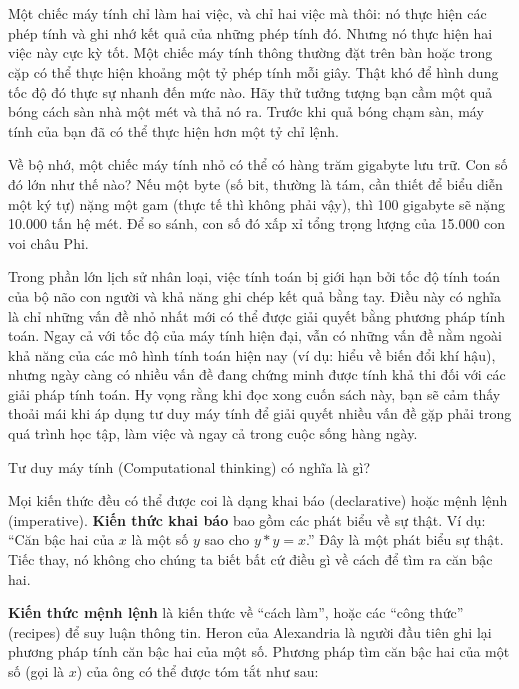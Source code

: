 \newpage
\chapter*{}
\noindent \indent Một chiếc máy tính chỉ làm hai việc, và chỉ hai việc mà thôi: nó thực hiện các phép tính và ghi nhớ kết quả của những phép tính đó. Nhưng nó thực hiện hai việc này cực kỳ tốt. Một chiếc máy tính thông thường đặt trên bàn hoặc trong cặp có thể thực hiện khoảng một tỷ phép tính mỗi giây. Thật khó để hình dung tốc độ đó thực sự nhanh đến mức nào. Hãy thử tưởng tượng bạn cầm một quả bóng cách sàn nhà một mét và thả nó ra. Trước khi quả bóng chạm sàn, máy tính của bạn đã có thể thực hiện hơn một tỷ chỉ lệnh.

Về bộ nhớ, một chiếc máy tính nhỏ có thể có hàng trăm gigabyte lưu trữ. Con số đó lớn như thế nào? Nếu một byte (số bit, thường là tám, cần thiết để biểu diễn một ký tự) nặng một gam (thực tế thì không phải vậy), thì 100 gigabyte sẽ nặng 10.000 tấn hệ mét. Để so sánh, con số đó xấp xỉ tổng trọng lượng của 15.000 con voi châu Phi.

Trong phần lớn lịch sử nhân loại, việc tính toán bị giới hạn bởi tốc độ tính toán của bộ não con người và khả năng ghi chép kết quả bằng tay. Điều này có nghĩa là chỉ những vấn đề nhỏ nhất mới có thể được giải quyết bằng phương pháp tính toán. Ngay cả với tốc độ của máy tính hiện đại, vẫn có những vấn đề nằm ngoài khả năng của các mô hình tính toán hiện nay (ví dụ: hiểu về biến đổi khí hậu), nhưng ngày càng có nhiều vấn đề đang chứng minh được tính khả thi đối với các giải pháp tính toán. Hy vọng rằng khi đọc xong cuốn sách này, bạn sẽ cảm thấy thoải mái khi áp dụng tư duy máy tính để giải quyết nhiều vấn đề gặp phải trong quá trình học tập, làm việc và ngay cả trong cuộc sống hàng ngày.

Tư duy máy tính (Computational thinking) có nghĩa là gì?

Mọi kiến thức đều có thể được coi là dạng khai báo (declarative) hoặc mệnh lệnh (imperative). \textbf{Kiến thức khai báo} bao gồm các phát biểu về sự thật. Ví dụ: ``Căn bậc hai của $x$ là một số $y$ sao cho $y * y = x$.'' Đây là một phát biểu sự thật. Tiếc thay, nó không cho chúng ta biết bất cứ điều gì về cách để tìm ra căn bậc hai.

\textbf{Kiến thức mệnh lệnh} là kiến thức về ``cách làm'', hoặc các ``công thức'' (recipes) để suy luận thông tin. Heron của Alexandria là người đầu tiên ghi lại phương pháp tính căn bậc hai của một số. Phương pháp tìm căn bậc hai của một số (gọi là $x$) của ông có thể được tóm tắt như sau:


